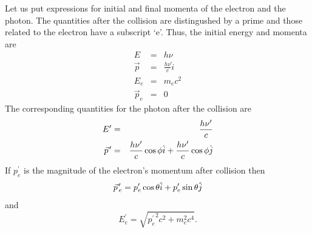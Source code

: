 Let us put expressions for initial and final momenta of the electron and the
photon. The quantities after the collision are distingushed by a prime and those
related to the electron have a subscript `e'. Thus, the initial energy and 
momenta are
\begin{eqnarray}
E &=& h\nu \label{c2s3e3} \\
\vec{p} &=& \frac{h\nu}{c}\hat{i} \label{c2s3e4} \\
E_e &=& m_ec^2 \label{c2s3e5} \\
\vec{p}_e &=& 0 \label{c2s3e6}
\end{eqnarray}
The corresponding quantities for the photon after the collision are
\begin{eqnarray}
E^\prime &=& \frac{h\nu^\prime}{c} \label{c2s3e7} \\
\pvec{p}^\prime &=& \frac{h\nu^\prime}{c}\cos\phi\hat{i} + 
                   \frac{h\nu^\prime}{c}\cos\phi\hat{j} \label{c2s3e8}
\end{eqnarray}
If $p_e^\prime$ is the magnitude of the electron's momentum after collision then
\begin{equation}\label{c2s3e9}
\pvec{p}_e^\prime = p_e^\prime\cos\theta\hat{i} + p_e^\prime\sin\theta\hat{j}
\end{equation}
and
\begin{equation}\label{c2s3e10}
E_e^\prime = \sqrt{{p_e^\prime}^2c^2 + m_e^2c^4}.
\end{equation}

